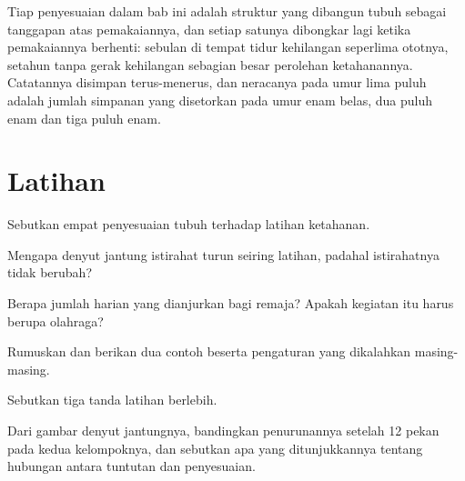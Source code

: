 \begin{remark}\label{rem:g10:sport-and-health:account}
Tiap penyesuaian dalam bab ini adalah struktur yang dibangun tubuh
sebagai tanggapan atas pemakaiannya, dan setiap satunya dibongkar lagi
ketika pemakaiannya berhenti: sebulan di tempat tidur kehilangan
seperlima ototnya, setahun tanpa gerak kehilangan sebagian besar
perolehan ketahanannya. Catatannya disimpan terus-menerus, dan
neracanya pada umur lima puluh adalah jumlah simpanan yang disetorkan
pada umur enam belas, dua puluh enam dan tiga puluh enam.
\end{remark}

\section{Latihan}

\begin{exercise}[$\star$]\label{exo:g10:sport-and-health:1}
Sebutkan empat penyesuaian tubuh terhadap latihan ketahanan.
\end{exercise}

\begin{exercise}[$\star$]\label{exo:g10:sport-and-health:2}
Mengapa denyut jantung istirahat turun seiring latihan, padahal  istirahatnya tidak berubah?
\end{exercise}

\begin{exercise}[$\star$]\label{exo:g10:sport-and-health:3}
Berapa jumlah  harian yang dianjurkan bagi remaja?
Apakah kegiatan itu harus berupa olahraga?
\end{exercise}

\begin{exercise}[$\star$]\label{exo:g10:sport-and-health:4}
Rumuskan  dan berikan dua contoh beserta pengaturan yang
dikalahkan masing-masing.
\end{exercise}

\begin{exercise}[$\star$]\label{exo:g10:sport-and-health:5}
Sebutkan tiga tanda latihan berlebih.
\end{exercise}

\begin{exercise}[$\star\star$]\label{exo:g10:sport-and-health:6}
Dari gambar denyut jantungnya, bandingkan penurunannya setelah 12 pekan
pada kedua kelompoknya, dan sebutkan apa yang ditunjukkannya tentang
hubungan antara tuntutan dan penyesuaian.
\end{exercise}

